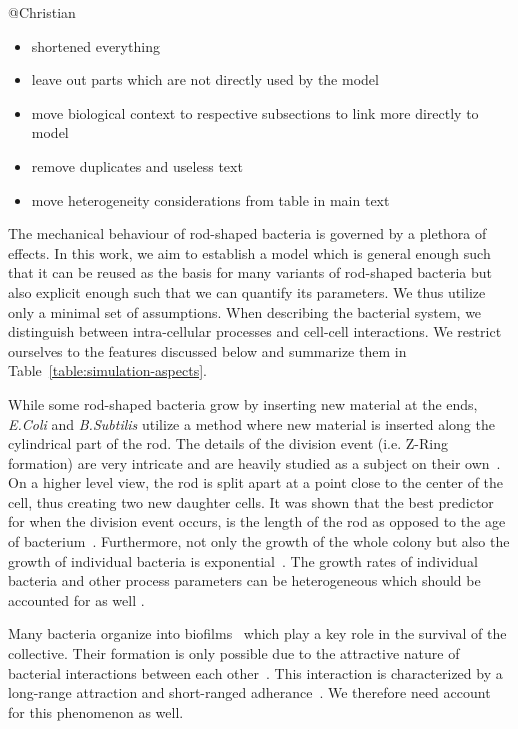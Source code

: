\documentclass[10pt,letterpaper]{article}
\begin{document}
@Christian
\begin{itemize}
    \item shortened everything
    \item leave out parts which are not directly used by the model
    \item move biological context to respective subsections to link more directly to model
    \item remove duplicates and useless text
    \item move heterogeneity considerations from table in main text
\end{itemize}

The mechanical behaviour of rod-shaped bacteria is governed by a plethora of effects.
In this work, we aim to establish a model which is general enough such that it can be reused as the
basis for many variants of rod-shaped bacteria but also explicit enough such that we can quantify
its parameters.
We thus utilize only a minimal set of assumptions.
When describing the bacterial system, we distinguish between intra-cellular processes and cell-cell
interactions.
We restrict ourselves to the features discussed below and summarize them in
Table~\ref{table:simulation-aspects}.

While some rod-shaped bacteria grow by inserting new material at the ends, \textit{E.Coli} and
\textit{B.Subtilis} utilize a method where new material is inserted along the cylindrical part of
the rod. The details of the division event (i.e. Z-Ring formation) are very intricate and are heavily
studied as a subject on their own~\cite{Harry2001}.
On a higher level view, the rod is split apart at a point close to the center of the cell, thus
creating two new daughter cells.
It was shown that the best predictor for when the division event occurs, is the length of the rod as
opposed to the age of bacterium~\cite{Robert2014}.
Furthermore, not only the growth of the whole colony but also the growth of individual bacteria is
exponential~\cite{Amir2014,Takeuchi2005}.
The growth rates of individual bacteria and other process parameters can be heterogeneous which
should be accounted for as well \cite{Koutsoumanis2013}.

Many bacteria organize into biofilms~\cite{Dunne2002,Ong1999} which play a key role in the survival
of the collective.
Their formation is only possible due to the attractive nature of bacterial interactions between
each other~\cite{Berne2018}.
This interaction is characterized by a long-range attraction and short-ranged
adherance~\cite{Verwey1947,Trejo2013}.
We therefore need account for this phenomenon as well.
\end{document}
